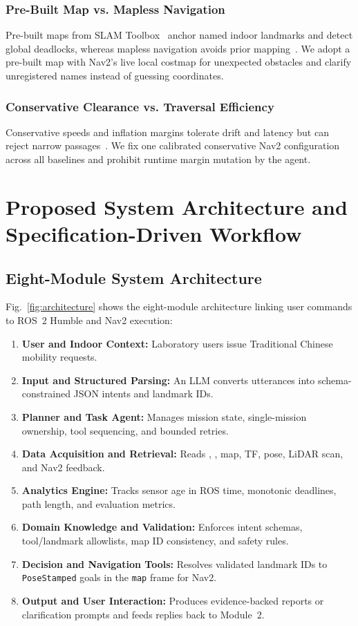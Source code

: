 \documentclass[conference,a4paper]{IEEEtran}
\begin{document}
\subsubsection{Pre-Built Map vs. Mapless Navigation}
Pre-built maps from SLAM Toolbox~\cite{b5} anchor named indoor landmarks and detect global deadlocks, whereas mapless navigation avoids prior mapping~\cite{b6}. We adopt a pre-built map with Nav2's live local costmap for unexpected obstacles and clarify unregistered names instead of guessing coordinates.

\subsubsection{Conservative Clearance vs. Traversal Efficiency}
Conservative speeds and inflation margins tolerate drift and latency but can reject narrow passages~\cite{b6, b9}. We fix one calibrated conservative Nav2 configuration across all baselines and prohibit runtime margin mutation by the agent.

\section{Proposed System Architecture and Specification-Driven Workflow}

\subsection{Eight-Module System Architecture}

Fig.~\ref{fig:architecture} shows the eight-module architecture linking user commands to ROS~2 Humble and Nav2 execution:
\begin{enumerate}
    \item \textbf{User and Indoor Context:} Laboratory users issue Traditional Chinese mobility requests.
    \item \textbf{Input and Structured Parsing:} An LLM converts utterances into schema-constrained JSON intents and landmark IDs.
    \item \textbf{Planner and Task Agent:} Manages mission state, single-mission ownership, tool sequencing, and bounded retries.
    \item \textbf{Data Acquisition and Retrieval:} Reads , , map, TF, pose, LiDAR scan, and Nav2 feedback.
    \item \textbf{Analytics Engine:} Tracks sensor age in ROS time, monotonic deadlines, path length, and evaluation metrics.
    \item \textbf{Domain Knowledge and Validation:} Enforces intent schemas, tool/landmark allowlists, map ID consistency, and safety rules.
    \item \textbf{Decision and Navigation Tools:} Resolves validated landmark IDs to \texttt{PoseStamped} goals in the \texttt{map} frame for Nav2.
    \item \textbf{Output and User Interaction:} Produces evidence-backed reports or clarification prompts and feeds replies back to Module~2.
\end{enumerate}
\end{document}
